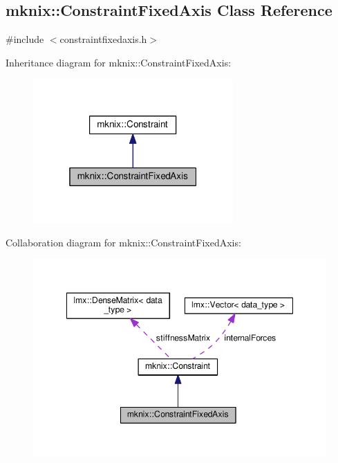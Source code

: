 \hypertarget{classmknix_1_1_constraint_fixed_axis}{}\subsection{mknix\+:\+:Constraint\+Fixed\+Axis Class Reference}
\label{classmknix_1_1_constraint_fixed_axis}


{\ttfamily \#include $<$constraintfixedaxis.\+h$>$}



Inheritance diagram for mknix\+:\+:Constraint\+Fixed\+Axis\+:\nopagebreak
\begin{figure}[H]
\begin{center}
\leavevmode
\includegraphics[width=217pt]{dc/d32/classmknix_1_1_constraint_fixed_axis__inherit__graph}
\end{center}
\end{figure}


Collaboration diagram for mknix\+:\+:Constraint\+Fixed\+Axis\+:\nopagebreak
\begin{figure}[H]
\begin{center}
\leavevmode
\includegraphics[width=348pt]{d0/d58/classmknix_1_1_constraint_fixed_axis__coll__graph}
\end{center}
\end{figure}
